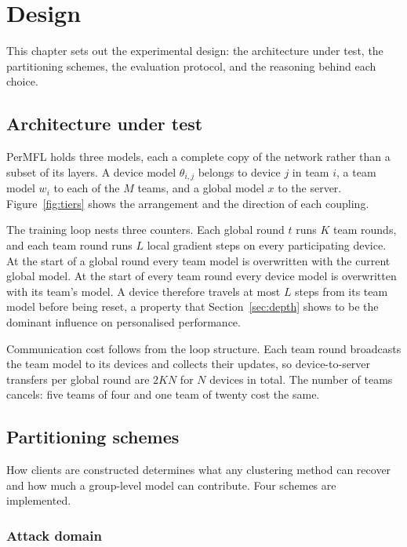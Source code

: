 \chapter{Design}
\label{chap:design}

This chapter sets out the experimental design: the architecture under test, the
partitioning schemes, the evaluation protocol, and the reasoning behind each
choice.

\section{Architecture under test}
\label{sec:architecture}

PerMFL holds three models, each a complete copy of the network rather than a
subset of its layers. A device model $\theta_{i,j}$ belongs to device $j$ in
team $i$, a team model $w_i$ to each of the $M$ teams, and a global model $x$
to the server. Figure~\ref{fig:tiers} shows the arrangement and the direction
of each coupling.

The training loop nests three counters. Each global round $t$ runs $K$ team
rounds, and each team round runs $L$ local gradient steps on every
participating device. At the start of a global round every team model is
overwritten with the current global model. At the start of every team round
every device model is overwritten with its team's model. A device therefore
travels at most $L$ steps from its team model before being reset, a property
that Section~\ref{sec:depth} shows to be the dominant influence on personalised
performance.

Communication cost follows from the loop structure. Each team round broadcasts
the team model to its devices and collects their updates, so device-to-server
transfers per global round are $2KN$ for $N$ devices in total. The number of
teams cancels: five teams of four and one team of twenty cost the same.

\section{Partitioning schemes}
\label{sec:partitioning}

How clients are constructed determines what any clustering method can recover
and how much a group-level model can contribute. Four schemes are implemented.

\subsection{Attack domain}

